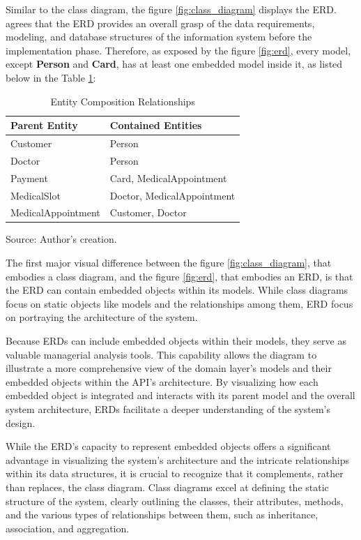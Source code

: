 Similar to the class diagram, the figure \ref{fig:class_diagram} displays the ERD. \cite{CAGILTAY20132184} agrees that the ERD provides an overall grasp of the data requirements, modeling, and database structures of the information system before the implementation phase. Therefore, as exposed by the figure \ref{fig:erd}, every model, except \textbf{Person} and
 \textbf{Card}, has at least one embedded model inside it, as listed below in the Table \ref{entity_relationships}:

\begin{table}[H]
\centering
\caption{Entity Composition Relationships}
\label{entity_relationships}
\begin{tabular}{p{}p{}}
\toprule
\textbf{Parent Entity} & \textbf{Contained Entities} \\
\midrule
Customer & Person \\ \hline
Doctor & Person \\ \hline
Payment & Card, MedicalAppointment \\ \hline
MedicalSlot & Doctor, MedicalAppointment \\ \hline
MedicalAppointment & Customer, Doctor \\
\bottomrule
\end{tabular}
\footnotesize Source: Author's creation.
\end{table}

The first major visual difference between the figure \ref{fig:class_diagram}, that embodies a class diagram, and the figure \ref{fig:erd}, that embodies an ERD, is that the ERD can contain embedded objects within its models. While class diagrams focus on static objects like models and the relationships among them, ERD focus on portraying the architecture of the system. 

Because ERDs can include embedded objects within their models, they serve as valuable managerial analysis tools. This capability allows the diagram to illustrate a more comprehensive view of the domain layer's models and their embedded objects within the API's architecture. By visualizing how each embedded object is integrated and interacts with its parent model and the overall system architecture, ERDs facilitate a deeper understanding of the system's design.

While the ERD's capacity to represent embedded objects offers a significant advantage in visualizing the system's architecture and the intricate relationships within its data structures, it is crucial to recognize that it complements, rather than replaces, the class diagram. Class diagrams excel at defining the static structure of the system, clearly outlining the classes, their attributes, methods, and the various types of relationships between them, such as inheritance, association, and aggregation. 

